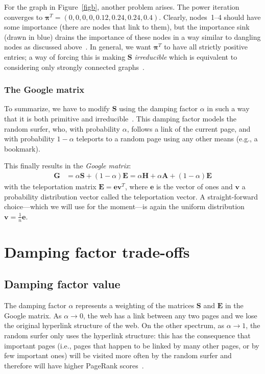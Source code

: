 \documentclass[a4paper,english,11pt]{scrartcl}
\renewcommand{\vec}[1]{\mathbf{#1}}
\begin{document}
For the graph in Figure~\ref{figb}, another problem arises. The power iteration converges to $\boldsymbol{\pi}^T=(0,0,0,0,0.12,0.24,0.24,0.4)$. Clearly, nodes~1--4 should have some importance (there are nodes that link to them), but the importance sink (drawn in blue) drains the importance of these nodes in a way similar to dangling nodes as discussed above~\cite{ams}.
In general, we want $\boldsymbol{\pi}^T$ to have all strictly positive entries; a way of forcing this is making $\vec{S}$ \emph{irreducible} which is equivalent to considering only strongly connected graphs~\cite{fiddling,Langville:2006:GPB:1146372}.

\subsubsection*{The Google matrix}
To summarize, we have to modify $\vec{S}$ using the damping factor $\alpha$ in such a way that it is both primitive and irreducible~\cite{ams}.
This damping factor models the random surfer, who, with probability $\alpha$, follows a link of the current page, and with probability $1 − \alpha$ teleports to a random page using any other means (e.g., a bookmark).

This finally results in the \emph{Google matrix}:
\begin{align}
\vec{G} &=\alpha \vec{S} + (1-\alpha)\vec{E} =  \alpha \vec{H} + \alpha \vec{A} + (1-\alpha)\vec{E}
                   \label{eq:google}                                                                                                                    
\end{align}
with the teleportation matrix $\vec{E}= \vec{e}\vec{v}^T$, where $\vec{e}$ is the vector of ones and $\vec{v}$ a probability distribution vector called the teleportation vector. A straight-forward choice---which we will use for the moment---is again the uniform distribution $\vec{v}= \frac{1}{n}\vec{e}$.


\section{Damping factor trade-offs}
\subsection{Damping factor value}
The damping factor $\alpha$ represents a weighting of the matrices $\vec{S}$ and $\vec{E}$ in the Google matrix.
As $\alpha\rightarrow{}0$, the web has a link between any two pages and we lose the original hyperlink structure of the web.
On the other spectrum, as $\alpha\rightarrow{}1$, the random surfer only uses the hyperlink structure: this has the consequence that important pages (i.e., pages that happen to be linked by many other pages, or by few important ones) will be visited more often by the random surfer and therefore will have higher PageRank scores~\cite{ams}. 
\end{document}
